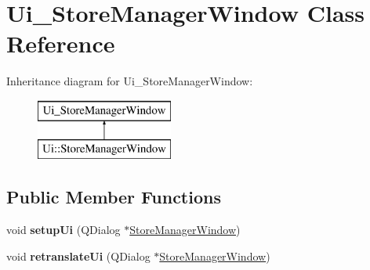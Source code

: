 \hypertarget{class_ui___store_manager_window}{}\section{Ui\+\_\+\+Store\+Manager\+Window Class Reference}
\label{class_ui___store_manager_window}
Inheritance diagram for Ui\+\_\+\+Store\+Manager\+Window\+:\begin{figure}[H]
\begin{center}
\leavevmode
\includegraphics[height=2.000000cm]{class_ui___store_manager_window}
\end{center}
\end{figure}
\subsection*{Public Member Functions}
\begin{DoxyCompactItemize}
\item 
\mbox{\label{class_ui___store_manager_window_a776986104a6bdec8c99e761a628403b3}} 
void {\bfseries setup\+Ui} (Q\+Dialog $\ast$\mbox{\hyperlink{class_store_manager_window}{Store\+Manager\+Window}})
\item 
\mbox{\label{class_ui___store_manager_window_aaee54dbc2f81b78d39d61e08a19b5638}} 
void {\bfseries retranslate\+Ui} (Q\+Dialog $\ast$\mbox{\hyperlink{class_store_manager_window}{Store\+Manager\+Window}})
\end{DoxyCompactItemize}
